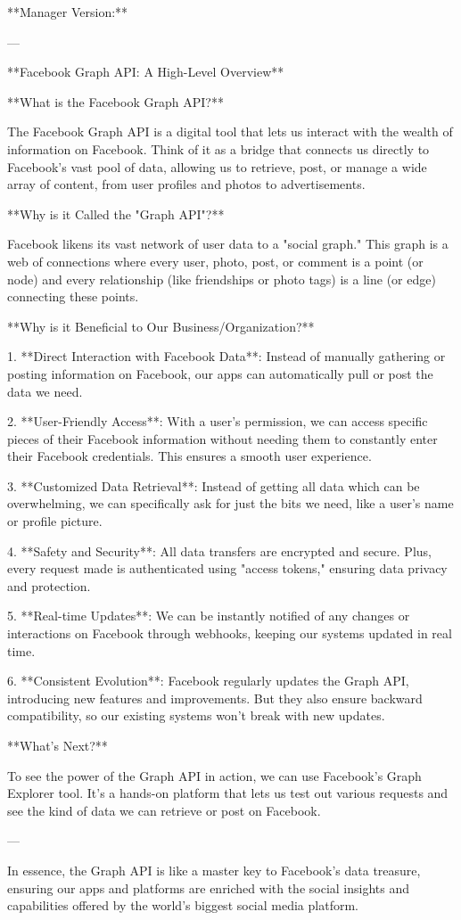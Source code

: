 **Manager Version:**

---

**Facebook Graph API: A High-Level Overview**

**What is the Facebook Graph API?**

The Facebook Graph API is a digital tool that lets us interact with the wealth of information on Facebook. Think of it as a bridge that connects us directly to Facebook's vast pool of data, allowing us to retrieve, post, or manage a wide array of content, from user profiles and photos to advertisements.

**Why is it Called the "Graph API"?**

Facebook likens its vast network of user data to a "social graph." This graph is a web of connections where every user, photo, post, or comment is a point (or node) and every relationship (like friendships or photo tags) is a line (or edge) connecting these points.

**Why is it Beneficial to Our Business/Organization?**

1. **Direct Interaction with Facebook Data**: Instead of manually gathering or posting information on Facebook, our apps can automatically pull or post the data we need.
   
2. **User-Friendly Access**: With a user's permission, we can access specific pieces of their Facebook information without needing them to constantly enter their Facebook credentials. This ensures a smooth user experience.
   
3. **Customized Data Retrieval**: Instead of getting all data which can be overwhelming, we can specifically ask for just the bits we need, like a user's name or profile picture.

4. **Safety and Security**: All data transfers are encrypted and secure. Plus, every request made is authenticated using "access tokens," ensuring data privacy and protection.

5. **Real-time Updates**: We can be instantly notified of any changes or interactions on Facebook through webhooks, keeping our systems updated in real time.

6. **Consistent Evolution**: Facebook regularly updates the Graph API, introducing new features and improvements. But they also ensure backward compatibility, so our existing systems won't break with new updates.

**What's Next?**

To see the power of the Graph API in action, we can use Facebook's Graph Explorer tool. It's a hands-on platform that lets us test out various requests and see the kind of data we can retrieve or post on Facebook.

---

In essence, the Graph API is like a master key to Facebook's data treasure, ensuring our apps and platforms are enriched with the social insights and capabilities offered by the world's biggest social media platform.